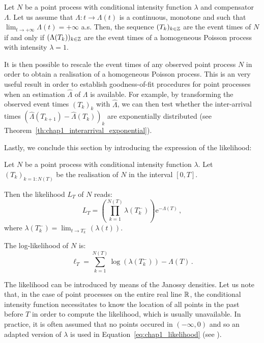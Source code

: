 \begin{theorem}{\parencite[Theorem 7.4.IV]{DaleyV1}}

    Let $N$ be a point process with conditional intensity function $\lambda$ and compensator $\Lambda$.
    Let us assume that $\Lambda:t\to \Lambda(t)$ is a continuous, monotone and such that $\lim_{t\to+\infty}\Lambda(t) = +\infty$ a.s.
    Then, the sequence $(T_k)_{k\in{\mathbb Z}}$ are the event times of $N$ if and only if $(\Lambda(T_k))_{k\in{\mathbb Z}}$ are the event times of a homogeneous Poisson process with intensity $\lambda=1$.
\end{theorem}
It is then possible to rescale the event times of any observed point process $N$ in order to obtain a realisation of a homogeneous Poisson process.
This is an very useful result in order to establish goodness-of-fit procedures for point processes when an estimation $\hat \Lambda$ of $\Lambda$ is available.
For example, by transforming the observed event times $(T_k)_k$ with $\hat \Lambda$, we can then test whether the inter-arrival times $(\hat \Lambda(T_{k+1}) - \hat \Lambda(T_k))_k$ are exponentially distributed (see Theorem~\ref{th:chap1_interarrival_exponential}).

Lastly, we conclude this section by introducing the expression of the likelihood:

\begin{proposition}{\parencite[Theorem 7.2.III]{DaleyV1}}

    Let $N$ be a point process with conditional intensity function $\lambda$.
    Let $(T_k)_{k=1:N(T)}$ be the realisation of $N$ in the interval $[0, T]$.
    
    Then the likelihood $L_T$ of $N$ reads:
    \begin{equation}\label{eq:chap1_likelihood}
        L_T = \left(\prod_{k=1}^{N(T)}{\lambda(T_k^-)}\right)\mathrm{e}^{-\Lambda(T)}\,,
    \end{equation}
    where $\lambda(T_k^-) = \lim_{t\to T_k^-}(\lambda(t))$.

    The log-likelihood of $N$ is:
    \[\ell_T = \sum_{k=1}^{N(T)}{\log(\lambda(T_k^-))} - \Lambda(T)\,.\]
\end{proposition}
The likelihood can be introduced by means of the Janossy densities.
Let us note that, in the case of point processes on the entire real line ${\mathbb R}$, the conditional intensity function necessitates to know the location of all points in the past before $T$ in order to compute the likelihood, which is usually unavailable.
In practice, it is often assumed that no points occured in $(-\infty, 0)$ and so an adapted version of $\lambda$ is used in Equation~\ref{eq:chap1_likelihood} (see \textcite{Ogata1978}).

